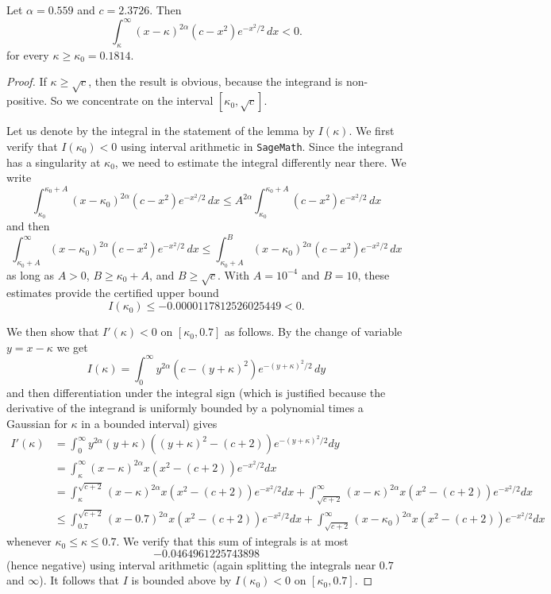 \documentclass[12pt]{amsart}
\numberwithin{equation}{section}
\begin{document}
\begin{lem} \label{lem:negative}
Let $\alpha = 0.559$ and $c=2.3726$. Then
\[
\int_\kappa^\infty (x-\kappa)^{2\alpha} (c-x^2) e^{-x^2/2} \,dx < 0.
\]
for every $\kappa \geq \kappa_0 = 0.1814$.
\end{lem}
\begin{proof}
If $\kappa \geq \sqrt{c}$, then the result is obvious, because the integrand is non-positive. So we concentrate on the interval $[\kappa_0,\sqrt{c}]$.

Let us denote by the integral in the statement of the lemma by $I(\kappa)$. We first verify that $I(\kappa_0)<0$ using interval arithmetic in \texttt{SageMath}. Since the integrand has a singularity at $\kappa_0$, we need to estimate the integral differently near there. We write
\[
\int_{\kappa_0}^{\kappa_0+A} (x-\kappa_0)^{2\alpha} (c-x^2) e^{-x^2/2} \,dx \leq A^{2\alpha}\int_{\kappa_0}^{\kappa_0+A}(c-x^2) e^{-x^2/2} \,dx
\]
and then
\[
\int_{\kappa_0+A}^\infty (x-\kappa_0)^{2\alpha} (c-x^2) e^{-x^2/2} \,dx \leq \int_{\kappa_0+A}^B (x-\kappa_0)^{2\alpha} (c-x^2) e^{-x^2/2} \,dx
\]
as long as $A>0$, $B\geq\kappa_0+A$, and $B \geq \sqrt{c}$. With $A= 10^{-4}$ and $B=10$, these estimates provide the certified upper bound
\[
I(\kappa_0) \leq -0.0000117812526025449 < 0.
\]

We then show that $I'(\kappa) < 0$ on $[\kappa_0,0.7]$ as follows. By the change of variable $y = x - \kappa$ we get
\[
I(\kappa) = \int_0^\infty y^{2\alpha} (c-(y+\kappa)^2) e^{-(y+\kappa)^2/2} \,dy
\]
and then differentiation under the integral sign (which is justified because the derivative of the integrand is uniformly bounded by a polynomial times a Gaussian for $\kappa$ in a bounded interval) gives
\begin{align*}
I'(\kappa) &= \int_0^\infty y^{2\alpha} (y+\kappa)((y+\kappa)^2-(c+2)) e^{-(y+\kappa)^2/2} dy \\
&= \int_\kappa^\infty (x-\kappa)^{2\alpha} x (x^2 - (c+2)) e^{-x^2/2} dx\\
&= \int_\kappa^{\sqrt{c+2}} (x-\kappa)^{2\alpha} x (x^2 - (c+2)) e^{-x^2/2} dx+\int_{\sqrt{c+2}}^\infty (x-\kappa)^{2\alpha} x (x^2 - (c+2)) e^{-x^2/2}dx\\
& \leq  \int_{0.7}^{\sqrt{c+2}} (x-0.7)^{2\alpha} x (x^2 - (c+2)) e^{-x^2/2} dx +\int_{\sqrt{c+2}}^\infty (x-\kappa_0)^{2\alpha} x (x^2 - (c+2)) e^{-x^2/2}dx
\end{align*}
whenever $\kappa_0 \leq \kappa \leq 0.7$. We verify that this sum of integrals is at most \[-0.0464961225743898\] (hence negative) using interval arithmetic (again splitting the integrals near $0.7$ and $\infty$). It follows that $I$ is bounded above by $I(\kappa_0)<0$ on $[\kappa_0,0.7]$.



\end{proof}
\end{document}
